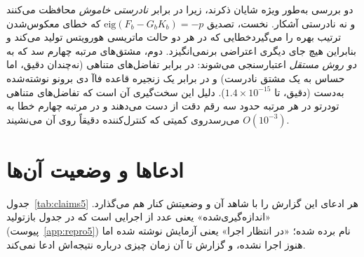 \documentclass[10pt,twocolumn]{article}
\newcommand{\md}{\lr{\textemdash}}
\begin{document}
دو بررسی به‌طور ویژه شایان ذکرند، زیرا در برابر \emph{نادرستی خاموش} محافظت
می‌کنند و نه نادرستی آشکار. نخست، تصدیق $\mathrm{eig}(F_b-G_bK_b)=-p$ که خطای
معکوس‌شدن ترتیب بهره را می‌گیرد\md{}خطایی که در هر دو حالت ماتریسی هورویتس تولید
می‌کند و بنابراین هیچ جای دیگری اعتراضی برنمی‌انگیزد. دوم، مشتق‌های مرتبه چهارم
سد که به \emph{دو روش مستقل} اعتبارسنجی می‌شوند: در برابر تفاضل‌های متناهی
(نه‌چندان دقیق، اما حساس به یک مشتق نادرست) و در برابر یک زنجیره قاعده
فاآ دی برونو نوشته‌شده به‌دست (دقیق، تا $1.4\times10^{-15}$). دلیل این
سخت‌گیری آن است که تفاضل‌های متناهی تودرتو در هر مرتبه حدود سه رقم دقت از دست
می‌دهند و در مرتبه چهارم خطا به $O(10^{-3})$ می‌رسد\md{}روی کمیتی که کنترل‌کننده
دقیقاً روی آن می‌نشیند.

\section{ادعاها و وضعیت آن‌ها}
جدول~\ref{tab:claims5} هر ادعای این گزارش را با شاهد آن و وضعیتش کنار هم می‌گذارد.
«اندازه‌گیری‌شده» یعنی عدد از اجرایی است که در جدول بازتولید (پیوست~\ref{app:repro5}) نام
برده شده؛ «در انتظار اجرا» یعنی آزمایش نوشته شده اما هنوز اجرا نشده، و گزارش تا آن زمان
چیزی درباره نتیجه‌اش ادعا نمی‌کند.
\end{document}
